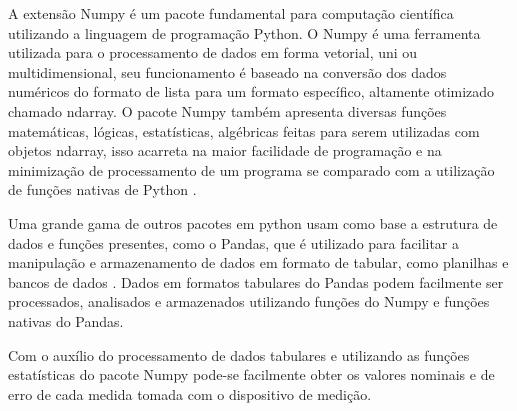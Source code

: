 A extensão Numpy é um pacote fundamental para computação científica utilizando a linguagem de programação Python.
O Numpy é uma ferramenta utilizada para o processamento de dados em forma vetorial, uni ou multidimensional, seu funcionamento é baseado na conversão dos dados numéricos do formato de lista para um
formato específico, altamente otimizado chamado ndarray.
O pacote Numpy também apresenta diversas funções matemáticas, lógicas, estatísticas, algébricas feitas para serem utilizadas com objetos ndarray, isso acarreta na maior facilidade de programação e
na minimização de processamento de um programa se comparado com a utilização de funções nativas de Python \autocite{DocsNumPy}.



Uma grande gama de outros pacotes em python usam como base a estrutura de dados e funções presentes, como o Pandas, que é utilizado para facilitar a manipulação e
armazenamento de dados em formato de tabular, como planilhas e bancos de dados \autocite{DocsPandas}.
Dados em formatos tabulares do Pandas podem facilmente ser processados, analisados e armazenados utilizando funções do Numpy e funções nativas do Pandas.

Com o auxílio do processamento de dados tabulares e utilizando as funções estatísticas do pacote Numpy pode-se facilmente obter os valores nominais e de erro de cada medida
tomada com o dispositivo de medição.

